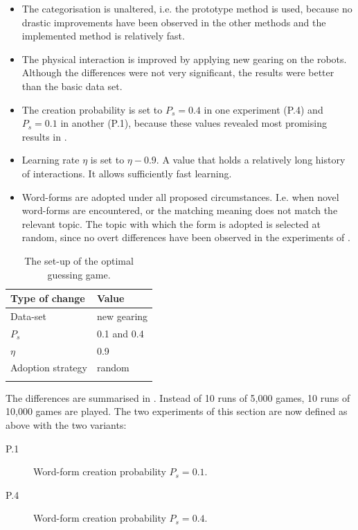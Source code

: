 \begin{itemize}
\item The categorisation is unaltered, i.e. the prototype method is used, because no drastic improvements have been observed in the other methods and the implemented method is relatively fast.

\item The physical interaction is improved by applying new gearing on the robots. Although the differences were not very significant, the results were better than the basic data set.

\item The creation probability is set to $P_s=0.4$ in one experiment (P.4) and $P_s=0.1$ in another (P.1), because these values revealed most promising results in .

\item Learning rate $\eta$ is set to $\eta-0.9$. A value that holds a relatively long history of interactions. It allows sufficiently fast learning.

\item Word-forms are adopted under all proposed circumstances. I.e. when novel word-forms are encountered, or the matching meaning does not match the relevant topic. The topic with which the form is adopted is selected at random, since no overt differences have been observed in the experiments of .
\end{itemize}


\begin{table}
\centering
\begin{tabular}{ll}
\lsptoprule
Type of change & Value\\\midrule
Data-set & new gearing\\%
$P_s$ & 0.1 and 0.4\\%
$\eta$ & 0.9\\%
Adoption strategy & random\\%
\lspbottomrule
\end{tabular}
\caption{The set-up of the optimal guessing game.}
\label{t:opt:gg1}
\end{table}

The differences are summarised in . Instead of 10 runs of 5,000 games, 10 runs of 10,000 games are played. The two experiments of this section are now defined as above with the two variants:

\begin{description}
\item[P.1] Word-form creation probability $P_s=0.1$.
\item[P.4] Word-form creation probability $P_s=0.4$.
\end{description}


